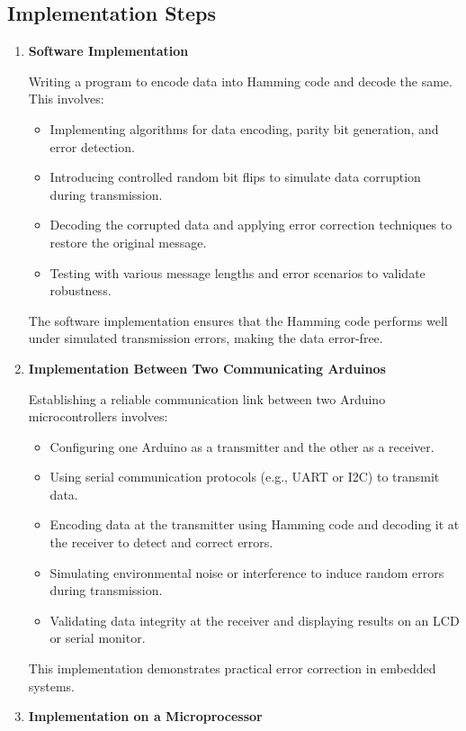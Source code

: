 \documentclass{article}
\numberwithin{equation}{section}
\numberwithin{figure}{section}
\numberwithin{table}{section}
\begin{document}
\subsection{Implementation Steps}
\begin{enumerate}

\item \textbf{Software Implementation}

Writing a program to encode data into Hamming code and decode the same. 
This involves:
\begin{itemize}
    \item Implementing algorithms for data encoding, parity bit generation, and error detection.
    \item Introducing controlled random bit flips to simulate data corruption during transmission.
    \item Decoding the corrupted data and applying error correction techniques to restore the original message.
    \item Testing with various message lengths and error scenarios to validate robustness.
\end{itemize}
The software implementation ensures that the Hamming code performs well under simulated transmission errors, making the data error-free.

\item \textbf{Implementation Between Two Communicating Arduinos}

Establishing a reliable communication link between two Arduino microcontrollers involves:
\begin{itemize}
    \item Configuring one Arduino as a transmitter and the other as a receiver.
    \item Using serial communication protocols (e.g., UART or I2C) to transmit data.
    \item Encoding data at the transmitter using Hamming code and decoding it at the receiver to detect and correct errors.
    \item Simulating environmental noise or interference to induce random errors during transmission.
    \item Validating data integrity at the receiver and displaying results on an LCD or serial monitor.
\end{itemize}
This implementation demonstrates practical error correction in embedded systems.

\item \textbf{Implementation on a Microprocessor}


\end{enumerate}
\end{document}

